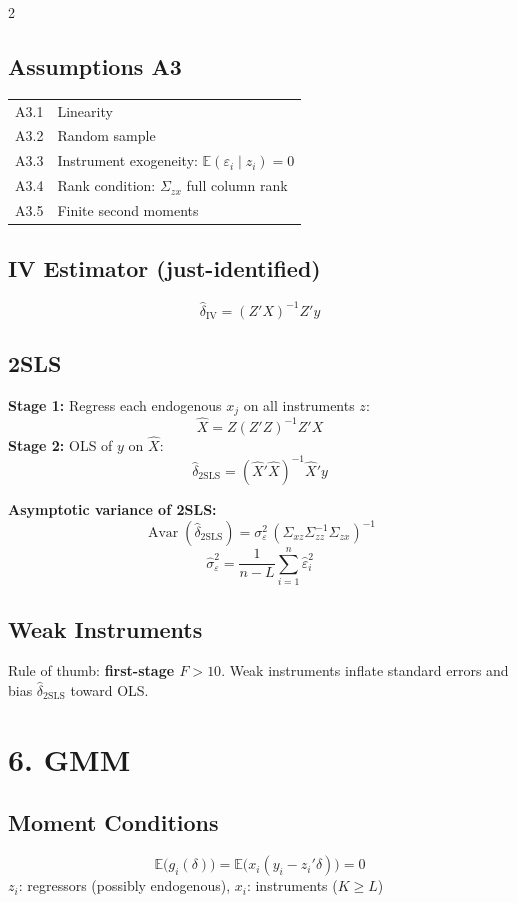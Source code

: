 \documentclass[9pt,a4paper]{article}
\newcommand{\Avar}{\operatorname{Avar}}
\newcommand{\E}{\mathbb{E}}
\begin{document}
\begin{multicols}{2}
\subsection*{Assumptions A3}
\begin{tabular}{@{}lp{5.5cm}@{}}
  A3.1 & Linearity \\
  A3.2 & Random sample \\
  A3.3 & Instrument exogeneity: $\E(\varepsilon_i \mid z_i)=0$ \\
  A3.4 & Rank condition: $\Sigma_{zx}$ full column rank \\
  A3.5 & Finite second moments \\
\end{tabular}

\subsection*{IV Estimator (just-identified)}
\[
  \hat\delta_\text{IV} = (Z'X)^{-1}Z'y
\]

\subsection*{2SLS}
\textbf{Stage 1:} Regress each endogenous $x_j$ on all instruments $z$:
\[
  \hat{X} = Z(Z'Z)^{-1}Z'X
\]
\textbf{Stage 2:} OLS of $y$ on $\hat{X}$:
\[
  \hat\delta_\text{2SLS} = (\hat{X}'\hat{X})^{-1}\hat{X}'y
\]

\textbf{Asymptotic variance of 2SLS:}
\[
  \Avar(\hat\delta_\text{2SLS}) = \sigma_\varepsilon^2\,(\Sigma_{xz}\Sigma_{zz}^{-1}\Sigma_{zx})^{-1}
\]
\[
  \hat\sigma_\varepsilon^2 = \frac{1}{n-L}\sum_{i=1}^n\hat\varepsilon_i^2
\]

\subsection*{Weak Instruments}
Rule of thumb: \textbf{first-stage $F > 10$}. Weak instruments inflate standard errors and bias $\hat\delta_\text{2SLS}$ toward OLS.

\section{6.\; GMM}

\subsection*{Moment Conditions}
\[
  \E\bigl(g_i(\delta)\bigr) = \E\bigl(x_i(y_i - z_i'\delta)\bigr) = 0
\]
$z_i$: regressors (possibly endogenous), $x_i$: instruments ($K \geq L$)


\end{multicols}
\end{document}
